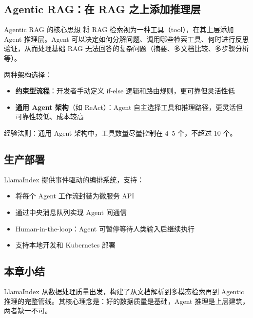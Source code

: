 \subsection{Agentic RAG：在 RAG 之上添加推理层}

\begin{importantbox}{Agentic RAG 的核心思想}
将 RAG 检索视为一种工具（tool），在其上层添加 Agent 推理层。Agent 可以决定如何分解问题、调用哪些检索工具、何时进行反思验证，从而处理基础 RAG 无法回答的复杂问题（摘要、多文档比较、多步骤分析等）。
\end{importantbox}

两种架构选择：
\begin{itemize}
    \item \textbf{约束型流程}：开发者手动定义 if-else 逻辑和路由规则，更可靠但灵活性低
    \item \textbf{通用 Agent 架构}（如 ReAct）：Agent 自主选择工具和推理路径，更灵活但可靠性较低、成本较高
\end{itemize}

经验法则：通用 Agent 架构中，工具数量尽量控制在 4--5 个，不超过 10 个。

\subsection{生产部署}

LlamaIndex 提供事件驱动的编排系统，支持：
\begin{itemize}
    \item 将每个 Agent 工作流封装为微服务 API
    \item 通过中央消息队列实现 Agent 间通信
    \item Human-in-the-loop：Agent 可暂停等待人类输入后继续执行
    \item 支持本地开发和 Kubernetes 部署
\end{itemize}

\subsection{本章小结}

LlamaIndex 从数据处理质量出发，构建了从文档解析到多模态检索再到 Agentic 推理的完整管线。其核心理念是：好的数据质量是基础，Agent 推理是上层建筑，两者缺一不可。

